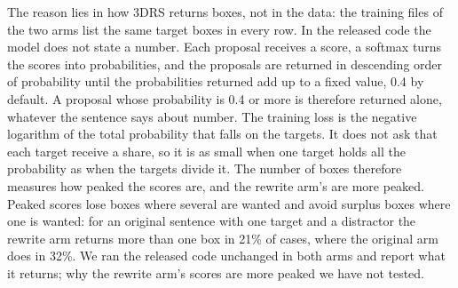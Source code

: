 The reason lies in how 3DRS returns boxes, not in the data: the training files of the two arms list the same target boxes in every row.
In the released code the model does not state a number.
Each proposal receives a score, a softmax turns the scores into probabilities, and the proposals are returned in descending order of probability until the probabilities returned add up to a fixed value, 0.4 by default.
A proposal whose probability is 0.4 or more is therefore returned alone, whatever the sentence says about number.
The training loss is the negative logarithm of the total probability that falls on the targets.
It does not ask that each target receive a share, so it is as small when one target holds all the probability as when the targets divide it.
The number of boxes therefore measures how peaked the scores are, and the rewrite arm's are more peaked.
Peaked scores lose boxes where several are wanted and avoid surplus boxes where one is wanted: for an original sentence with one target and a distractor the rewrite arm returns more than one box in 21\% of cases, where the original arm does in 32\%.
We ran the released code unchanged in both arms and report what it returns; why the rewrite arm's scores are more peaked we have not tested.


